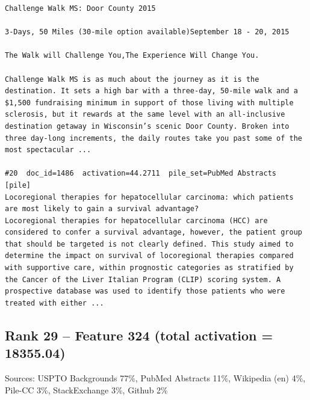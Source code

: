 \begin{verbatim}
Challenge Walk MS: Door County 2015

3-Days, 50 Miles (30-mile option available)September 18 - 20, 2015

The Walk will Challenge You,The Experience Will Change You.

Challenge Walk MS is as much about the journey as it is the destination. It sets a high bar with a three-day, 50-mile walk and a $1,500 fundraising minimum in support of those living with multiple sclerosis, but it rewards at the same level with an all-inclusive destination getaway in Wisconsin’s scenic Door County. Broken into three day-long increments, the daily routes take you past some of the most spectacular ...

#20  doc_id=1486  activation=44.2711  pile_set=PubMed Abstracts  [pile]
Locoregional therapies for hepatocellular carcinoma: which patients are most likely to gain a survival advantage?
Locoregional therapies for hepatocellular carcinoma (HCC) are considered to confer a survival advantage, however, the patient group that should be targeted is not clearly defined. This study aimed to determine the impact on survival of locoregional therapies compared with supportive care, within prognostic categories as stratified by the Cancer of the Liver Italian Program (CLIP) scoring system. A prospective database was used to identify those patients who were treated with either ...

\end{verbatim}

\subsection*{Rank 29 -- Feature 324 (total activation = 18355.04)}

Sources: USPTO Backgrounds 77\%, PubMed Abstracts 11\%, Wikipedia (en) 4\%, Pile-CC 3\%, StackExchange 3\%, Github 2\%

